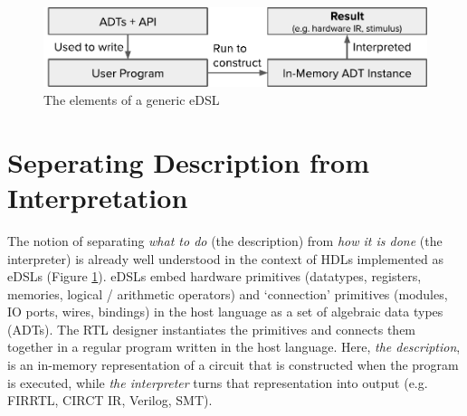 \documentclass[sigplan,review,nonacm,9pt]{acmart}
\begin{document}

\maketitle

\vspace{-0.5cm}
\begin{figure}[h]
\includegraphics[width=\linewidth]{simcommand/functional_apis.pdf}
\caption{The elements of a generic eDSL}
\label{fig:functional_apis}
\end{figure}
\vspace{-0.5cm}

\section{Seperating Description from Interpretation}


The notion of separating \textit{what to do} (the description) from \textit{how it is done} (the interpreter) is already well understood in the context of HDLs implemented as eDSLs (Figure \ref{fig:functional_apis}).
eDSLs embed hardware primitives (datatypes, registers, memories, logical / arithmetic operators) and `connection' primitives (modules, IO ports, wires, bindings) in the host language as a set of algebraic data types (ADTs).
The RTL designer instantiates the primitives and connects them together in a regular program written in the host language.
Here, \textit{the description}, is an in-memory representation of a circuit that is constructed when the program is executed, while \textit{the interpreter} turns that representation into output (e.g. FIRRTL\cite{firrtl}, CIRCT IR\cite{circt}, Verilog, SMT).
\end{document}
